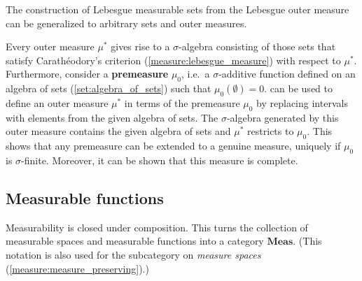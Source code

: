     The construction of Lebesgue measurable sets from the Lebesgue outer measure can be generalized to arbitrary sets and outer measures.
    \begin{construct}\label{measure:caratheodory}
        Every outer measure $\mu^*$ gives rise to a $\sigma$-algebra consisting of those sets that satisfy Carath\'eodory's criterion (\cref{measure:lebesgue_measure}) with respect to $\mu^*$. Furthermore, consider a \textbf{premeasure} $\mu_0$, i.e.~a $\sigma$-additive function defined on an algebra of sets (\cref{set:algebra_of_sets}) such that $\mu_0(\emptyset) = 0$.  can be used to define an outer measure $\mu^*$ in terms of the premeasure $\mu_0$ by replacing intervals with elements from the given algebra of sets. The $\sigma$-algebra generated by this outer measure contains the given algebra of sets and $\mu^*$ restricts to $\mu_0$. This shows that any premeasure can be extended to a genuine measure, uniquely if $\mu_0$ is $\sigma$-finite. Moreover, it can be shown that this measure is complete.
    \end{construct}

\subsection{Measurable functions}

    \begin{property}
        Measurability is closed under composition. This turns the collection of measurable spaces and measurable functions into a category $\mathbf{Meas}$. (This notation is also used for the subcategory on \textit{measure spaces} (\cref{measure:measure_preserving}).)
    \end{property}


